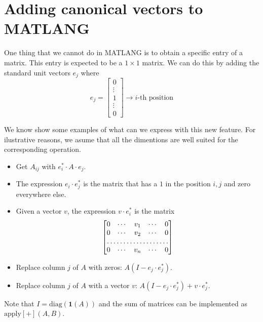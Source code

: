 \section{Adding canonical vectors to MATLANG}
One thing that we cannot do in MATLANG is to obtain a specific entry of a matrix. This entry is expected to be a $1\times 1$ matrix. We can do this by adding the standard unit vectors $e_j$ where 
\[
e_j=
\begin{bmatrix}
    0 \\
    \vdots \\
    1 \\
    \vdots \\
    0
\end{bmatrix}
\rightarrow i\text{-th position}
\]

We know show some examples of what can we express with this new feature. For ilustrative reasons, we asume that all the dimentions are well suited for the corresponding operation.

\begin{itemize}
	\item Get $A_{ij}$ with $e_i^*\cdot A\cdot e_j$.
	\item The expression $e_i\cdot e_j^*$ is the matrix that has a $1$ in the position $i,j$ and zero everywhere else.
	\item Given a vector $v$, the expression $v\cdot e_i^*$ is the matrix 
	\[
\begin{bmatrix}
    0 & \cdots & v_{1} & \cdots & 0 \\
    0 & \cdots & v_{2} & \cdots & 0 \\
    \hdotsfor{5} \\
    0 & \cdots & v_{n} & \cdots & 0 
\end{bmatrix}
\]
	\item Replace column $j$ of $A$ with zeros: $A(I-e_j\cdot e_j^*)$.
	\item Replace column $j$ of $A$ with a vector $v$: $A(I-e_j\cdot e_j^*) + v\cdot e_j^*$.
\end{itemize}

Note that $I=\text{diag}(\mathbf{1}(A))$ and the sum of matrices can be implemented as $\text{apply}\left[ + \right](A, B)$.
\label{sec:canonical}